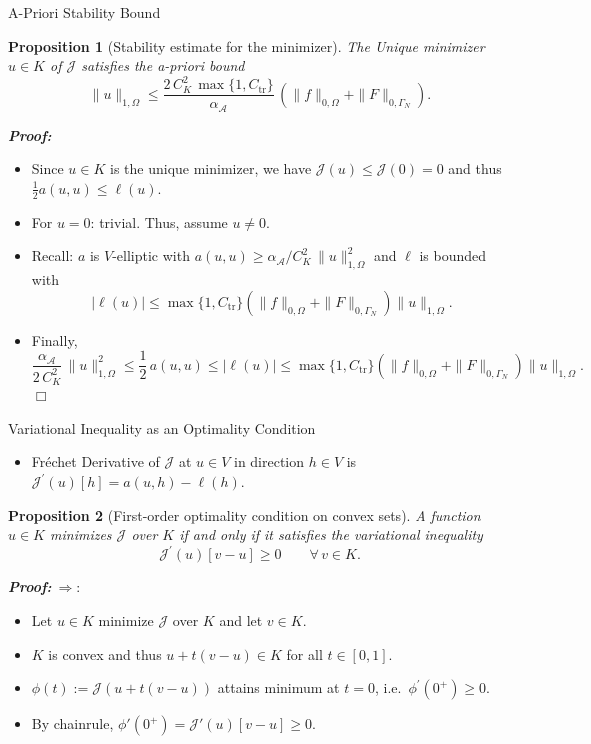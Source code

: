 \documentclass[10pt,aspectratio=169]{beamer}
\newtheorem{proposition}{Proposition}[section]
\def\cA{{\mathcal A}}
\def\cJ{{\mathcal J}}
\def\eop{\hfill{$\Box$}}
\begin{document}
\begin{frame}{A-Priori Stability Bound}
	\begin{proposition}[Stability estimate for the minimizer]
		The Unique minimizer $u\in K$ of $\cJ$ satisfies the a-priori bound
		\begin{equation*}
			\|u\|_{1,\Omega} \le \frac{2\,C_K^2\,\max\{1,C_\mathrm{tr}\}}{\alpha_\cA}\,\left(\|f\|_{0,\Omega} +\|F\|_{0,\Gamma_N}\right).
		\end{equation*}
	\end{proposition}
	\textbf{\em Proof:}
	\begin{itemize}
		\item Since $u\in K$ is the unique minimizer, we have $\cJ(u)\le\cJ(0) = 0$ and thus $\tfrac12a(u,u)\le \ell(u)$.
		\item For $u = 0$: trivial. Thus, assume $u\neq 0$.
		\item Recall: $a$ is $V$-elliptic with $a(u,u)\ge \alpha_\cA/C_K^2\,\|u\|_{1,\Omega}^2$ and $\ell$ is bounded with
		      \begin{equation*}
			      |\ell(u)|\le  \max\{1,C_{\mathrm{tr}}\}\left(\|f\|_{0,\Omega} +\|F\|_{0,\Gamma_N}\right)\|u\|_{1,\Omega}.
		      \end{equation*}
		\item Finally,
		      \begin{equation*}
			      \frac{\alpha_\cA}{2\,C_K^2}\,\|u\|_{1,\Omega}^2\le \frac{1}{2}\,a(u,u)\le |\ell(u)|\le  \max\{1,C_{\mathrm{tr}}\}\left(\|f\|_{0,\Omega} +\|F\|_{0,\Gamma_N}\right)\|u\|_{1,\Omega}.
		      \end{equation*}\eop
	\end{itemize}
\end{frame}

\begin{frame}{Variational Inequality as an Optimality Condition}
	\begin{itemize}
		\item Fréchet Derivative of $\cJ$ at $u\in V$ in direction $h\in V$ is $\cJ^\prime(u)[h] = a(u,h)-\ell(h)$.
	\end{itemize}
	\begin{proposition}[First-order optimality condition on convex sets]
		A function $u\in K$ minimizes $\cJ$ over $K$ if and only if it satisfies the variational inequality
		\begin{equation*}
			\cJ^\prime(u)[v-u]\ge 0\qquad\forall\, v\in K.
		\end{equation*}
	\end{proposition}
	\textbf{\em Proof:}$\ \Longrightarrow:$
	\begin{itemize}
		\item Let $u\in K$ minimize $\cJ$ over $K$ and let $v\in K$.
		\item $K$ is convex and thus $u+t(v-u)\in K$ for all $t\in[0,1]$.
		\item $\phi(t):= \cJ(u+t(v-u))$ attains minimum at $t = 0$, i.e.\ $\phi^\prime(0^+)\ge 0$.
		\item By chainrule, $\phi'(0^+)=\cJ'(u)[v-u]\ge 0$.
	\end{itemize}
\end{frame}
\end{document}

